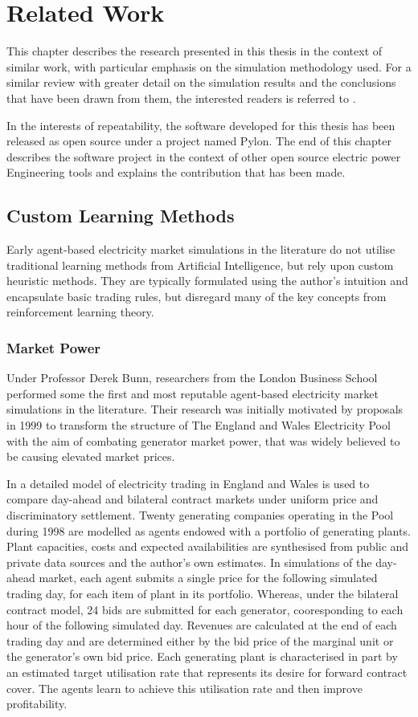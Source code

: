 \chapter{Related Work}
\label{ch:related_work}
This chapter describes the research presented in this thesis in the
context of similar work, with particular emphasis on the simulation
methodology used.  For a similar review with greater detail on the
simulation results and the conclusions that have been drawn from them, the
interested readers is referred to \cite{weidlich:08}.

In the interests of repeatability, the software developed for this thesis has
been released as open source under a project named Pylon.  The end of this
chapter describes the software project in the context of other open source
electric power Engineering tools and explains the contribution that has
been made.

\section{Custom Learning Methods}
Early agent-based electricity market simulations in the literature do not
utilise traditional learning methods from Artificial Intelligence, but rely
upon custom heuristic methods.  They are typically formulated using the
author's intuition and encapsulate basic trading rules, but disregard many of
the key concepts from reinforcement learning theory.

\subsection{Market Power}
Under Professor Derek Bunn, researchers from the London Business School
performed some the first and most reputable agent-based electricity
market simulations in the literature.  Their research was initially motivated
by proposals in 1999 to transform the structure of The England and Wales
Electricity Pool with the aim of combating generator market power, that was
widely believed to be causing elevated market prices.

In \cite{bower:2001} a
detailed model of electricity trading in England and Wales is used to compare
day-ahead and bilateral contract markets under uniform price and
discriminatory settlement.  Twenty generating companies operating in the Pool
during 1998 are modelled as agents endowed with a portfolio of generating
plants.  Plant capacities, costs and expected availabilities are synthesised
from public and private data sources and the author's own estimates.  In
simulations of the day-ahead market, each agent submits a single price for the
following simulated trading day, for each item of plant in its portfolio.
Whereas, under the bilateral contract model, 24 bids are submitted for each
generator, cooresponding to each hour of the following simulated day.  Revenues
are calculated at the end of each trading day and are determined either by the
bid price of the marginal unit or the generator's own bid price.  Each
generating plant is characterised in part by an estimated target utilisation
rate that represents its desire for forward contract cover.  The agents learn
to achieve this utilisation rate and then improve profitability.


